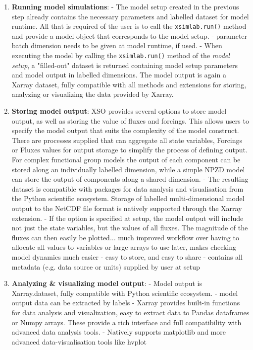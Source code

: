 \documentclass[journal abbreviation, manuscript]{copernicus}
\begin{document}
\begin{enumerate}
    \item \textbf{Running model simulations}:
    - The model setup created in the previous step already contains the necessary parameters and labelled dataset for model runtime. All that is required of the user is to call the \texttt{xsimlab.run()} method and provide a model object that corresponds to the model setup.
    - parameter batch dimension needs to be given at model runtime, if used.
    - When executing the model by calling the \texttt{xsimlab.run()} method of the \textit{model setup}, a "filled-out" dataset is returned containing model setup parameters and model output in labelled dimensions. The model output is again a Xarray dataset, fully compatible with all methods and extensions for storing, analyzing or visualizing the data provided by Xarray.
    
    \item \textbf{Storing model output}: 
    XSO provides several options to store model output, as well as storing the value of fluxes and forcings. This allows users to specify the model output that suits the complexity of the model construct. There are processes supplied that can aggregate all state variables, Forcings or Fluxes values for output storage to simplify the process of defining output. For complex functional group models the output of each component can be stored along an individually labelled dimension, while a simple NPZD model can store the output of components along a shared dimension.
    - The resulting dataset is compatible with packages for data analysis and visualisation from the Python scientific ecosystem. Storage of labelled multi-dimensional model output to the NetCDF file format is natively supported through the Xarray extension. 
    - If the option is specified at setup, the model output will include not just the state variables, but the values of all fluxes. The magnitude of the fluxes can then easily be plotted... much improved workflow over having to allocate all values to variables or large arrays to use later, makes checking model dynamics much easier
    - easy to store, and easy to share
    - contains all metadata (e.g. data source or units) supplied by user at setup
    
    \item \textbf{Analyzing & visualizing model output}:
    - Model output is Xarray.dataset, fully compatible with Python scientific ecosystem.
     - model output data can be extracted by labels 
    - Xarray provides built-in functions for data analysis and visualization, easy to extract data to Pandas dataframes or Numpy arrays. These provide a rich interface and full compatibility with advanced data analysis tools.
    - Natively supports matplotlib and more advanced data-visualisation tools like hvplot

\end{enumerate}
\end{document}
